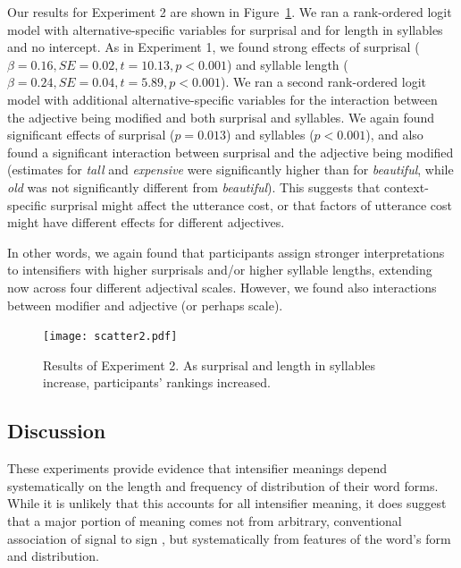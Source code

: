 \documentclass[10pt,letterpaper]{article}
\newcommand{\w}[1]{\emph{#1}}
\begin{document}
Our results for Experiment 2 are shown in Figure~\ref{exp2-plot}. We ran a rank-ordered logit model \cite{beggs1981, hausman1987} with alternative-specific variables for surprisal and for length in syllables and no intercept. As in Experiment 1, we found strong effects of surprisal ($\beta=0.16, SE=0.02, t=10.13, p<0.001$) and syllable length ($\beta=0.24, SE=0.04, t=5.89, p<0.001$).
We ran a second rank-ordered logit model with additional alternative-specific variables for the interaction between the adjective being modified and both surprisal and syllables. We again found significant effects of surprisal ($p=0.013$) and syllables ($p<0.001$), and also found a significant interaction between surprisal and the adjective being modified (estimates for \w{tall} and \w{expensive} were significantly higher than for \w{beautiful}, while \w{old} was not significantly different from \w{beautiful}).
This suggests that context-specific surprisal might affect the utterance cost, or that factors of utterance cost might have different effects for different adjectives.

In other words, we again found that participants assign stronger interpretations to intensifiers with higher surprisals and/or higher syllable lengths, extending now across four different adjectival scales. However, we found also interactions between modifier and adjective (or perhaps scale).

\begin{figure}[hbt]
\begin{center}
\texttt{[image: scatter2.pdf]}
\end{center}
\caption{Results of Experiment 2. As surprisal and length in syllables increase, participants' rankings increased.} 
\label{exp2-plot}
\end{figure}

\subsection{Discussion}    
These experiments provide evidence that intensifier meanings depend systematically on the length and frequency of distribution of their word forms.
While it is unlikely that this accounts for all intensifier meaning, it does suggest that a major portion of meaning comes not from arbitrary, conventional association of signal to sign \cite{saussure}, but systematically from features of the word's form and distribution.
\end{document}
